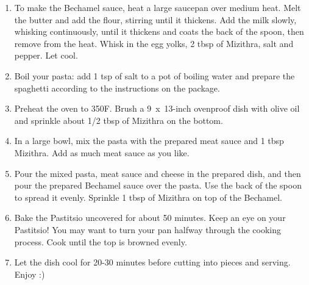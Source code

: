 \begin{enumerate}
    \item To make the Bechamel sauce, heat a large saucepan over medium heat. Melt the butter and add the flour, stirring until it thickens. Add the milk slowly, whisking continuously, until it thickens and coats the back of the spoon, then remove from the heat. Whisk in the egg yolks, 2 tbsp of Mizithra, salt and pepper. Let cool.
    \item Boil your pasta: add 1 tsp of salt to a pot of boiling water and prepare the spaghetti according to the instructions on the package.
    \item Preheat the oven to 350\degree F. Brush a 9~x~13-inch ovenproof dish with olive oil and sprinkle about 1/2 tbsp of Mizithra on the bottom.
    \item In a large bowl, mix the pasta with the prepared meat sauce and 1 tbsp Mizithra. Add as much meat sauce as you like.
    \item Pour the mixed pasta, meat sauce and cheese in the prepared dish, and then pour the prepared Bechamel sauce over the pasta. Use the back of the spoon to spread it evenly. Sprinkle 1 tbsp of Mizithra on top of the Bechamel.
    \item Bake the Pastitsio uncovered for about 50 minutes. Keep an eye on your Pastitsio! You may want to turn your pan halfway through the cooking process. Cook until the top is browned evenly.
    \item Let the dish cool for 20-30 minutes before cutting into pieces and serving. Enjoy :)
\end{enumerate}
